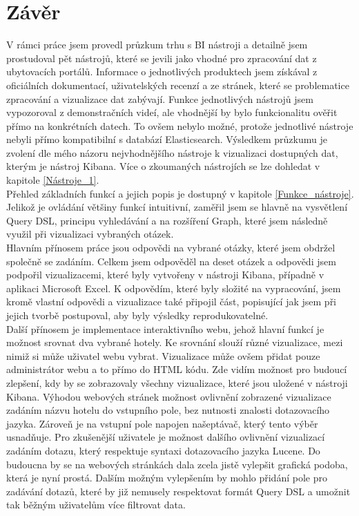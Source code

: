\documentclass[czech,BP]{thesiskiv}
\begin{document}
\chapter{Závěr}
\label{závěr}
V rámci práce jsem provedl průzkum trhu s BI nástroji a detailně jsem prostudoval pět nástrojů, které se jevili jako vhodné pro zpracování dat z ubytovacích portálů. Informace o jednotlivých  produktech jsem získával z oficiálních dokumentací, uživatelských recenzí a ze stránek, které se problematice zpracování a vizualizace dat zabývají. Funkce jednotlivých nástrojů jsem vypozoroval z demonstračních videí, ale vhodnější by bylo funkcionalitu ověřit přímo na konkrétních datech. To ovšem nebylo možné, protože jednotlivé nástroje nebyli přímo kompatibilní s databází Elasticsearch. Výsledkem průzkumu je zvolení dle mého názoru nejvhodnějšího nástroje k vizualizaci dostupných dat, kterým je nástroj Kibana. Více o zkoumaných nástrojích se lze dohledat v kapitole \ref{Nástroje_1}.
\\
Přehled základních funkcí a jejich popis je dostupný v kapitole \ref{Funkce_nástroje}. Jelikož je ovládání většiny funkcí intuitivní, zaměřil jsem se hlavně na vysvětlení Query DSL, principu vyhledávání a na rozšíření Graph, které jsem následně využil při vizualizaci vybraných otázek.
\\
Hlavním přínosem práce jsou odpovědi na vybrané otázky, které jsem obdržel společně se zadáním. Celkem jsem odpověděl na deset otázek a odpovědi jsem podpořil vizualizacemi, které byly vytvořeny v nástroji Kibana, případně v aplikaci Microsoft Excel. K odpovědím, které byly složité na vypracování, jsem kromě vlastní odpovědi a vizualizace také připojil část, popisující jak jsem při jejich tvorbě postupoval, aby byly výsledky reprodukovatelné. 
\\
Další přínosem je implementace interaktivního webu, jehož hlavní funkcí je možnost srovnat dva vybrané hotely. Ke srovnání slouží různé vizualizace, mezi nimiž si může uživatel webu vybrat. Vizualizace může ovšem přidat pouze administrátor  webu a to přímo do HTML kódu. Zde vidím možnost pro budoucí zlepšení, kdy by se zobrazovaly všechny vizualizace, které jsou uložené v nástroji Kibana. Výhodou webových stránek možnost ovlivnění zobrazené vizualizace zadáním názvu hotelu do vstupního pole, bez nutnosti znalosti  dotazovacího jazyka. Zároveň je na vstupní pole napojen našeptávač, který tento výběr usnadňuje. Pro  zkušenější uživatele je možnost dalšího ovlivnění vizualizací zadáním dotazu, který respektuje syntaxi dotazovacího jazyka Lucene. Do budoucna by se na webových stránkách dala zcela jistě vylepšit grafická podoba, která je nyní prostá. Dalším možným vylepšením by mohlo přidání pole pro zadávání dotazů, které by již nemusely respektovat formát Query DSL a umožnit tak běžným uživatelům více filtrovat data.
\end{document}
